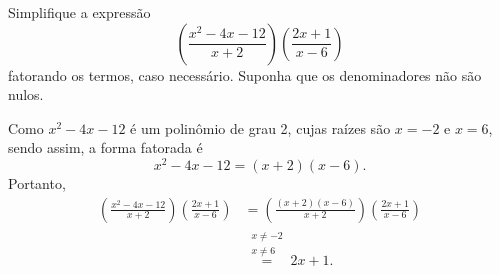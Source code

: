 \begin{example}
  Simplifique a expressão
  \[
    \left(\frac{x^2-4x-12}{x+2} \right) \left( \frac{2x+1}{x-6}\right)
  \]
  fatorando os termos, caso necessário.
  Suponha que os denominadores não são nulos.

  \solution
  Como $x^2-4x-12$ é um polinômio de grau 2, cujas raízes são $x=-2$ e
  $x=6$, sendo assim, a forma fatorada é
  \[
    x^2 - 4x - 12 = (x+2)(x-6).
  \]
  Portanto,
  \begin{align*}
    \left(\frac{x^2-4x-12}{x+2} \right)
    \left( \frac{2x+1}{x-6}\right)
    & = \left(\frac{(x+2)(x-6)}{x+2} \right)
        \left( \frac{2x+1}{x-6}\right)
    \\
    & \stackrel{\substack{x \neq -2\\ x \neq 6}}{=} 2x + 1.
  \end{align*}
\end{example}

